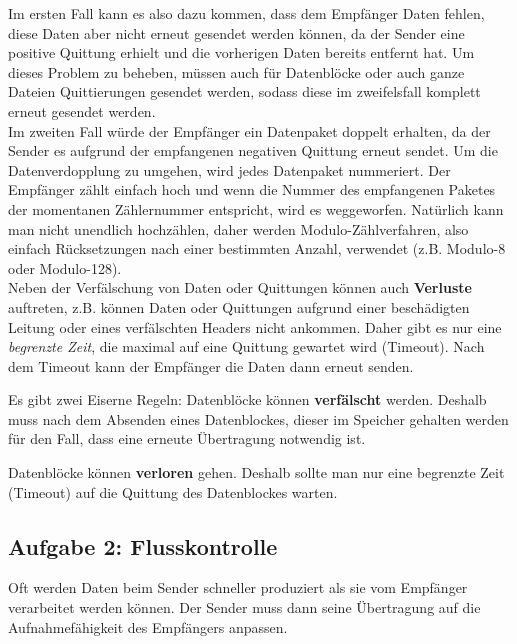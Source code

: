 \documentclass[11pt, a4paper]{article}
\begin{document}
Im ersten Fall kann es also dazu kommen, dass dem Empfänger Daten fehlen, diese Daten aber nicht erneut gesendet werden können, da der Sender eine positive Quittung erhielt und die vorherigen Daten bereits entfernt hat.
Um dieses Problem zu beheben, müssen auch für Datenblöcke oder auch ganze Dateien Quittierungen gesendet werden, sodass diese im zweifelsfall komplett erneut gesendet werden.\\

Im zweiten Fall würde der Empfänger ein Datenpaket doppelt erhalten, da der Sender es aufgrund der empfangenen negativen Quittung erneut sendet. Um die Datenverdopplung zu umgehen, wird jedes Datenpaket nummeriert. Der Empfänger zählt einfach hoch und wenn die Nummer des empfangenen Paketes der momentanen Zählernummer entspricht, wird es weggeworfen. Natürlich kann man nicht unendlich hochzählen, daher werden Modulo-Zählverfahren, also einfach Rücksetzungen nach einer bestimmten Anzahl, verwendet (z.B. Modulo-8 oder Modulo-128).\\

Neben der Verfälschung von Daten oder Quittungen können auch \textbf{Verluste} auftreten, z.B. können Daten oder Quittungen aufgrund einer beschädigten Leitung oder eines verfälschten Headers nicht ankommen. Daher gibt es nur eine \emph{begrenzte Zeit}, die maximal auf eine Quittung gewartet wird (Timeout). Nach dem Timeout kann der Empfänger die Daten dann erneut senden.

\begin{figure}[H]
\centering
{}
\end{figure}

Es gibt zwei \glqq{} Eiserne Regeln\grqq{}:
 {
  Datenblöcke können \textbf{verfälscht} werden. Deshalb muss nach dem Absenden eines Datenblockes, dieser im Speicher gehalten werden für den Fall, dass eine erneute Übertragung notwendig ist.
}

 {
  Datenblöcke können \textbf{verloren} gehen. Deshalb sollte man nur eine begrenzte Zeit (Timeout) auf die Quittung des Datenblockes warten.
}



\subsection{Aufgabe 2: Flusskontrolle}
Oft werden Daten beim Sender schneller produziert als sie vom Empfänger verarbeitet werden können. Der Sender muss dann seine Übertragung auf die Aufnahmefähigkeit des Empfängers anpassen.\\
\end{document}
